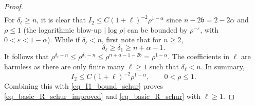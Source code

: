 \documentclass[12pt]{amsart}
\begin{document}
\begin{proof}
\begin{align*}
\end{align*}
For $\delta_\ell \ge n$, it is clear that $I_2 \le C (1+\ell)^{-2} \rho^{1-\alpha}$ since $n-2\mathfrak b=2-2\alpha$ and $\rho\le 1$ (the logarithmic blow-up $|\log{\rho}|$ can be bounded by $\rho^{-\varepsilon}$, with $0<\varepsilon<1-\alpha$). While if $\delta_\ell <n$, first note that for $n\ge 2$, 
\begin{equation}\label{eq_delta_lower}
    \delta_\ell \ge \delta_1\geq n+\alpha-1.
\end{equation}
It follows that $\rho^{\delta_\ell-n} \le \rho^{\delta_1-n} \le \rho^{n+\alpha-1-2\mathfrak b} = \rho^{1-\alpha}$. The coefficients in $\ell$ are harmless as there are only finite many $\ell\ge 1$ such that $\delta_\ell < n$. In summary, 
\begin{equation*}
    I_2 \le C (1+\ell)^{-2} \rho^{1-\alpha},\qquad 0<\rho \le 1.
\end{equation*}
Combining this with \eqref{eq_I1_bound_schur} proves \eqref{eq_basic_R_schur_improved} and \eqref{eq_basic_R_schur} with $\ell \ge 1$.




\end{proof}
\end{document}

